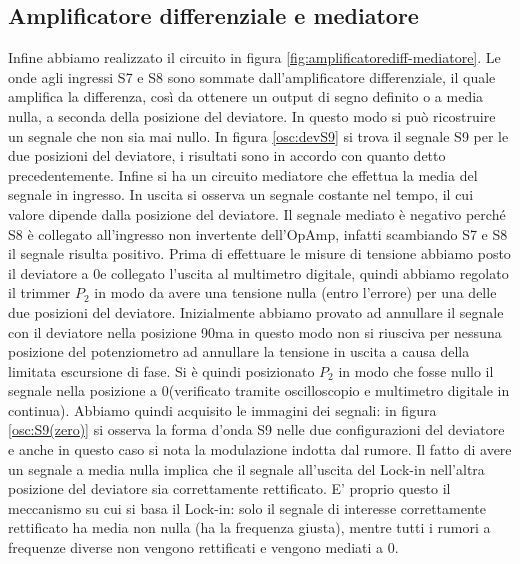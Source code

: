 \documentclass[10pt,a4paper]{article}
\begin{document}
\subsection{Amplificatore differenziale e mediatore}
Infine abbiamo realizzato il circuito in figura \ref{fig:amplificatorediff-mediatore}. Le onde agli ingressi S7 e S8 sono sommate dall'amplificatore differenziale, il quale amplifica la differenza, così da ottenere un output di segno definito o a media nulla, a seconda della posizione del deviatore. In questo modo si può ricostruire un segnale che non sia mai nullo.
In figura \ref{osc:devS9} si trova il segnale S9 per le due posizioni del deviatore, i risultati sono in accordo con quanto detto precedentemente.
Infine si ha un circuito mediatore che effettua la media del segnale in ingresso. In uscita si osserva un segnale costante nel tempo, il cui valore dipende dalla posizione del deviatore. %
Il segnale mediato è negativo perché S8 è collegato all'ingresso non invertente dell'OpAmp, infatti scambiando S7 e S8 il segnale risulta positivo.
 Prima di effettuare le misure di tensione abbiamo posto il deviatore a 0\degree e collegato l'uscita al multimetro digitale, quindi abbiamo regolato il trimmer $P_2$ in modo da avere una tensione nulla (entro l'errore) per una delle due posizioni del deviatore. Inizialmente abbiamo provato ad annullare il segnale con il deviatore nella posizione 90\degree ma in questo modo non si riusciva per nessuna posizione del potenziometro ad annullare la tensione in uscita a causa della limitata escursione di fase. Si è quindi posizionato $P_2$ in modo che fosse nullo il segnale nella posizione a 0\degree (verificato tramite oscilloscopio e multimetro digitale in continua). Abbiamo quindi acquisito le immagini dei segnali: in figura \ref{osc:S9(zero)} si osserva la forma d'onda S9 nelle due configurazioni del deviatore e anche in questo caso si nota la modulazione indotta dal rumore. Il fatto di avere un segnale a media nulla implica che il segnale all'uscita del Lock-in nell'altra posizione del deviatore sia correttamente rettificato. E' proprio questo il meccanismo su cui si basa il Lock-in: solo il segnale di interesse correttamente rettificato ha media non nulla (ha la frequenza giusta), mentre tutti i rumori a frequenze diverse non vengono rettificati e vengono mediati a 0.\\
\end{document}
